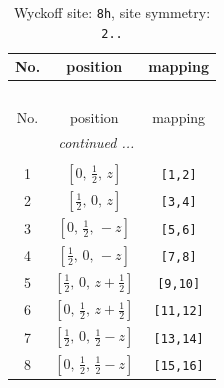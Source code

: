 \documentclass[fleqn,8pt]{jsarticle}
\begin{document}
\begin{longtable}{ccc}
\caption{Wyckoff site: {\tt 8h}, site symmetry: {\tt 2..}}
 \\
 \hline \hline
No. & position & mapping \\ \hline \endfirsthead

\multicolumn{2}{l}{\tablename\ \thetable{}} \\
 \hline \hline
No. & position & mapping \\ \hline \endhead

 \hline \hline
\multicolumn{2}{r}{\footnotesize\it continued ...} \\ \endfoot

 \hline \hline
\multicolumn{2}{r}{} \\ \endlastfoot

1 & $\left[ 0,\, \frac{1}{2},\, z \right]$ & {\tt [1,2]} \\ \hline
2 & $\left[ \frac{1}{2},\, 0,\, z \right]$ & {\tt [3,4]} \\ \hline
3 & $\left[ 0,\, \frac{1}{2},\, - z \right]$ & {\tt [5,6]} \\ \hline
4 & $\left[ \frac{1}{2},\, 0,\, - z \right]$ & {\tt [7,8]} \\ \hline
5 & $\left[ \frac{1}{2},\, 0,\, z + \frac{1}{2} \right]$ & {\tt [9,10]} \\ \hline
6 & $\left[ 0,\, \frac{1}{2},\, z + \frac{1}{2} \right]$ & {\tt [11,12]} \\ \hline
7 & $\left[ \frac{1}{2},\, 0,\, \frac{1}{2} - z \right]$ & {\tt [13,14]} \\ \hline
8 & $\left[ 0,\, \frac{1}{2},\, \frac{1}{2} - z \right]$ & {\tt [15,16]} \\
\end{longtable}
\renewcommand{\arraystretch}{1.2}
\end{document}
